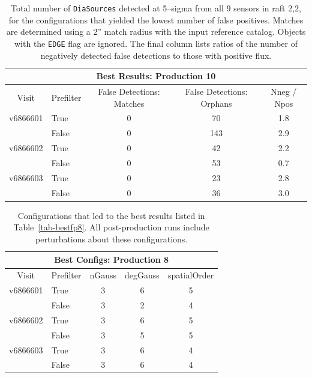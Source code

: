 \documentclass[prd, nofootinbib, floatfix, 11pt,tightenlines,times]{article}
\begin{document}
\begin{table}
\centering
\begin{tabular}{clccc}
\hline
\multicolumn{5}{|c|}{Best Results: Production 10} \\
\hline
Visit    & Prefilter & False Detections: Matches & False Detections: Orphans & Nneg / Npos \\
\hline
v6866601 & True      & 0                         & 70  & 1.8 \\
         & False     & 0                         & 143 & 2.9 \\
v6866602 & True      & 0                         & 42  & 2.2 \\
         & False     & 0                         & 53  & 0.7 \\
v6866603 & True      & 0                         & 23  & 2.8 \\
         & False     & 0                         & 36  & 3.0 \\
\end{tabular}
\caption{Total number of {\tt DiaSources} detected at 5--sigma from
  all 9 sensors in raft 2,2, for the configurations that yielded the
  lowest number of false positives.  Matches are determined using a
  2'' match radius with the input reference catalog.  Objects with the
  {\tt EDGE} flag are ignored.  The final column lists ratios of the
  number of negatively detected false detections to those with
  positive flux. \label{tab-bestfp10}}
\end{table}

\clearpage

\begin{table}
\centering
\begin{tabular}{clccc}
\hline
\multicolumn{5}{|c|}{Best Configs: Production 8} \\
\hline
Visit    & Prefilter & nGauss & degGauss & spatialOrder \\
\hline
v6866601 & True      & 3      & 6        & 5 \\
         & False     & 3      & 2        & 4 \\
v6866602 & True      & 3      & 6        & 5 \\
         & False     & 3      & 5        & 5 \\
v6866603 & True      & 3      & 6        & 4 \\
         & False     & 3      & 6        & 4 \\
\end{tabular}
\caption{Configurations that led to the best results listed in
  Table~\ref{tab-bestfp8}.  All post-production runs include
  perturbations about these configurations. \label{tab-bestconfig8}}
\end{table}
\end{document}
